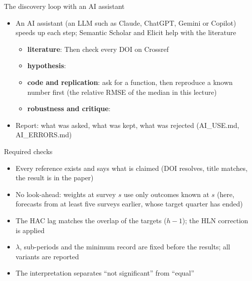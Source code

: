 \begin{frame}{The discovery loop with an AI assistant}
\itemsize{\footnotesize}
\begin{itemize}
    \item An AI assistant (an LLM such as Claude, ChatGPT, Gemini or Copilot) speeds up each step; Semantic Scholar and Elicit help with the literature
    \begin{itemize}
        \item \textbf{literature}:  Then check every DOI on Crossref
        \item \textbf{hypothesis}: 
        \item \textbf{code and replication}: ask for a function, then reproduce a known number first (the relative RMSE of the median in this lecture)
        \item \textbf{robustness and critique}: 
    \end{itemize}
    \item Report: what was asked, what was kept, what was rejected (AI\_USE.md, AI\_ERRORS.md)
\end{itemize}
\end{frame}

\begin{frame}{Required checks}
\itemsize{\small}
\begin{itemize}
    \item Every reference exists and says what is claimed (DOI resolves, title matches, the result is in the paper)
    \item No look-ahead: weights at survey $s$ use only outcomes known at $s$ (here, forecasts from at least five surveys earlier, whose target quarter has ended)
    \item The HAC lag matches the overlap of the targets ($h - 1$); the HLN correction is applied
    \item $\lambda$, sub-periods and the minimum record are fixed before the results; all variants are reported
    \item The interpretation separates ``not significant'' from ``equal''
\end{itemize}
\end{frame}

